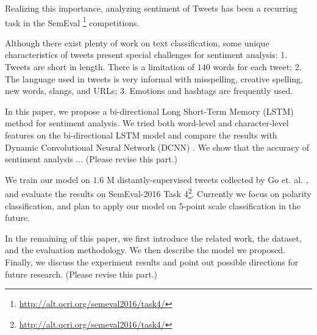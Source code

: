 \documentclass{article} %
\begin{document}
Realizing this importance, analyzing sentiment of Tweets has been a recurring task in the SemEval \footnote{\url{http://alt.qcri.org/semeval2016/task4/}} competitions.


Although there exist plenty of work on text classification, some unique characteristics of tweets present special challenges for sentiment analysis:
1. Tweets are short in length. There is a limitation of $140$ words for each tweet; 2. The language used in tweets is very informal with misspelling, creative spelling,  new words, slangs, and URLs; 3. Emotions and hashtags are frequently used.

In this paper, we propose a bi-directional Long Short-Term Memory (LSTM) method for sentiment analysis. We tried both word-level and character-level features on the bi-directional LSTM model and compare the results with Dynamic Convolutional Neural Network (DCNN) \cite{kalchbrenner2014convolutional}.
We show that the accuracy of sentiment analysis ... (Please revise this part.)

We train our model on $1.6$ M distantly-supervised tweets collected by Go et. al. \cite{go2009twitter}, and evaluate the results on SemEval-2016 Task 4\footnote{\url{http://alt.qcri.org/semeval2016/task4/}}. Currently we focus on polarity classification, and plan to apply our model on 5-point scale classification in the future. 

In the remaining of this paper, we first introduce the related work, the dataset, and the evaluation methodology. We then describe the model we proposed. Finally, we discuss the experiment results and point out possible directions for future research. (Please revise this part.)
\end{document}
